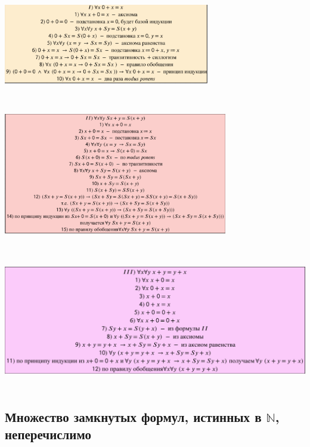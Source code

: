 \begin{center}
    \includegraphics[width=9cm,height = 4.5cm]{images/1.9-1.12_m101.PNG}

    \includegraphics[width=9.8cm,height = 6cm]{images/1.9-1.12_m102.PNG}

    \includegraphics[width=15cm, height = 6cm]{images/1.9-1.12_m103.PNG}
\end{center}

\subsection{Множество замкнутых формул, истинных в $\mathbb N$, неперечислимо}

